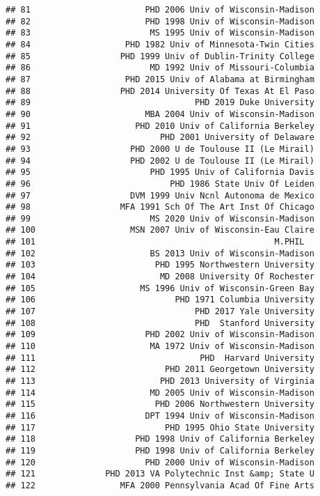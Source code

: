 \documentclass[
]{article}
\begin{document}
\begin{verbatim}
## 81                       PHD 2006 Univ of Wisconsin-Madison
## 82                       PHD 1998 Univ of Wisconsin-Madison
## 83                        MS 1995 Univ of Wisconsin-Madison
## 84                   PHD 1982 Univ of Minnesota-Twin Cities
## 85                  PHD 1999 Univ of Dublin-Trinity College
## 86                        MD 1992 Univ of Missouri-Columbia
## 87                   PHD 2015 Univ of Alabama at Birmingham
## 88                  PHD 2014 University Of Texas At El Paso
## 89                                 PHD 2019 Duke University
## 90                       MBA 2004 Univ of Wisconsin-Madison
## 91                     PHD 2010 Univ of California Berkeley
## 92                          PHD 2001 University of Delaware
## 93                    PHD 2000 U de Toulouse II (Le Mirail)
## 94                    PHD 2002 U de Toulouse II (Le Mirail)
## 95                        PHD 1995 Univ of California Davis
## 96                            PHD 1986 State Univ Of Leiden
## 97                    DVM 1999 Univ Ncnl Autonoma de Mexico
## 98                  MFA 1991 Sch Of The Art Inst Of Chicago
## 99                        MS 2020 Univ of Wisconsin-Madison
## 100                   MSN 2007 Univ of Wisconsin-Eau Claire
## 101                                                M.PHIL  
## 102                       BS 2013 Univ of Wisconsin-Madison
## 103                        PHD 1995 Northwestern University
## 104                         MD 2008 University Of Rochester
## 105                     MS 1996 Univ of Wisconsin-Green Bay
## 106                            PHD 1971 Columbia University
## 107                                PHD 2017 Yale University
## 108                                PHD  Stanford University
## 109                      PHD 2002 Univ of Wisconsin-Madison
## 110                       MA 1972 Univ of Wisconsin-Madison
## 111                                 PHD  Harvard University
## 112                          PHD 2011 Georgetown University
## 113                         PHD 2013 University of Virginia
## 114                       MD 2005 Univ of Wisconsin-Madison
## 115                        PHD 2006 Northwestern University
## 116                      DPT 1994 Univ of Wisconsin-Madison
## 117                          PHD 1995 Ohio State University
## 118                    PHD 1998 Univ of California Berkeley
## 119                    PHD 1998 Univ of California Berkeley
## 120                      PHD 2000 Univ of Wisconsin-Madison
## 121              PHD 2013 VA Polytechnic Inst &amp; State U
## 122                 MFA 2000 Pennsylvania Acad Of Fine Arts

\end{verbatim}
\end{document}
